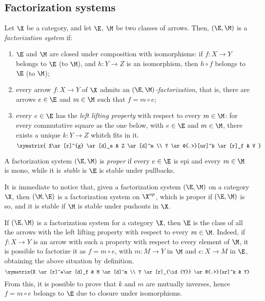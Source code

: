 
\iffalse 
\subsection{Factorization systems}

\begin{definition}\label{def:fact_sys}
	Let $\X$ be a category, and let $\E$, $\M$ be two classes of arrows.
	Then, $(\E, \M)$ is a \emph{factorization system} if:
	\begin{enumerate}
		\item $\E$ and $\M$ are closed under composition with isomorphisms: if $f: X \to Y$ belongs to $\E$ (to $\M$), and $h: Y\to Z$ is an isomorphism, then $h \circ f$ belongs to $\E$ (to $\M$);
		\item every arrow $f: X \to Y$ of $\X$ admits an \emph{$(\E, \M)$-factorization}, that is, there are arrows $e \in \E$ and $m \in \M$ such that $f = m\circ e$;
		\item every $e \in \E$ has the \emph{left lifting property} with respect to every $m \in \M$: for every commutative square as the one below, with $e \in \E$ and $m \in \M$,
			there exists a unique $k: Y \to Z$ whitch fits in it.
			\[\xymatrix{
					X\ar[r]^{g} \ar[d]_e & Z \ar[d]^m \\ Y \ar@{.>}[ur]^k \ar[r]_f & V
			}\]
	\end{enumerate}
	A factorization system $(\E, \M)$ is \emph{proper} if every $e \in \E$ is epi and every $m \in \M$ is mono, while it is \emph{stable} is $\E$ is stable under pullbacks.
\end{definition}

\begin{remark}\label{rem:dual_fact_sys}
	It is immediate to notice that, given a factorization system $(\E, \M)$ on a category $\X$, then $(\M, \E)$ is a factorization system on $\X^{op}$, which is proper if $(\E, \M)$ is so, and it is stable if
	$\M$ is stable under pushouts in $\X$.
\end{remark}

\begin{remark}
	If $(\E, \M)$ is a factorization system for a category $\X$, then $\E$ is the class of all the arrows with the left lifting property with respect to every $m\in \M$.
	Indeed, if $f:X \to Y$ is an arrow with such a property with respect to every element of $\M$, it is possible to factorize it as $f = m \circ e$, with $m: M \to Y$ in $\M$ and 
	$e: X \to M$ in $\E$, obtaining the above situation by definition.
	\[\xymatrix{X \ar[r]^e\ar[d]_f & M \ar[d]^m \\ Y \ar[r]_{\id{Y}} \ar@{.>}[ur]^k & Y}\]
	From this, it is possible to prove that $k$ and $m$ are mutually inverses, hence $f = m\circ e$ belongs to $\E$ due to closure under isomorphisms.
\end{remark}

